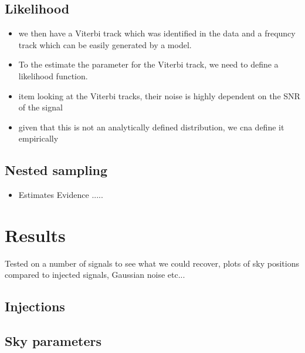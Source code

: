 \subsection{Likelihood}

\begin{itemize}
    
    \item we then have a Viterbi track which was identified in the data and a frequncy track which can be easily generated by a model.
    \item To the estimate the parameter for the Viterbi track, we need to define a likelihood function.
    \item item looking at the Viterbi tracks, their noise is highly dependent on the \gls{SNR} of the signal
    \item given that this is not an analytically defined distribution, we cna define it empirically
\end{itemize}


\subsection{Nested sampling}

\begin{itemize}
    \item Estimates Evidence .....
\end{itemize}


\section{Results}
Tested on a number of signals to see what we could recover, 
plots of sky positions compared to injected signals, 
Gaussian noise etc...
\subsection{Injections}

\subsection{Sky parameters}


